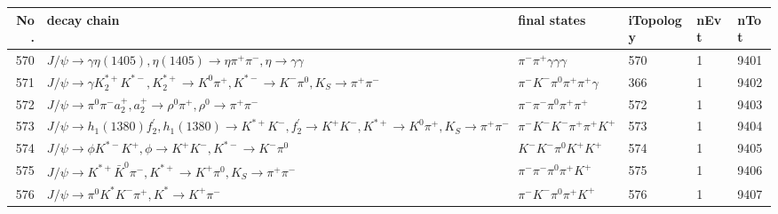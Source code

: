 \begin{table}[htbp] 
\begin{center}
\begin{small}
\begin{tabular}{rlllll}\hline\hline
 No. & decay chain & final states &  iTopology & nEvt & nTot \\\hline
570&$J/\psi       \rightarrow \gamma       \eta(1405)    , \eta(1405)     \rightarrow \eta          \pi^{+}        \pi^{-}        , \eta           \rightarrow \gamma       \gamma       $&$\pi^{-}        \pi^{+}        \gamma       \gamma       \gamma       $&  570&    1& 9401\\
571&$J/\psi       \rightarrow \gamma       K_2^{*+}       K^{*-}         , K_2^{*+}        \rightarrow K^{0}          \pi^{+}        , K^{*-}          \rightarrow K^{-}          \pi^{0}        , K_{S}           \rightarrow \pi^{+}        \pi^{-}        $&$\pi^{-}        K^{-}          \pi^{0}        \pi^{+}        \pi^{+}        \gamma       $&  366&    1& 9402\\
572&$J/\psi       \rightarrow \pi^{0}        \pi^{-}        a_{2}^{+}      , a_{2}^{+}       \rightarrow \rho^{0}      \pi^{+}        , \rho^{0}       \rightarrow \pi^{+}        \pi^{-}        $&$\pi^{-}        \pi^{-}        \pi^{0}        \pi^{+}        \pi^{+}        $&  572&    1& 9403\\
573&$J/\psi       \rightarrow h_{1}(1380)    f_2^{'}       , h_{1}(1380)     \rightarrow K^{*+}         K^{-}          , f_2^{'}        \rightarrow K^{+}          K^{-}          , K^{*+}          \rightarrow K^{0}          \pi^{+}        , K_{S}           \rightarrow \pi^{+}        \pi^{-}        $&$\pi^{-}        K^{-}          K^{-}          \pi^{+}        \pi^{+}        K^{+}          $&  573&    1& 9404\\
574&$J/\psi       \rightarrow \phi           K^{*-}         K^{+}          , \phi            \rightarrow K^{+}          K^{-}          , K^{*-}          \rightarrow K^{-}          \pi^{0}        $&$K^{-}          K^{-}          \pi^{0}        K^{+}          K^{+}          $&  574&    1& 9405\\
575&$J/\psi       \rightarrow K^{*+}         \bar{K}^{0}   \pi^{-}        , K^{*+}          \rightarrow K^{+}          \pi^{0}        , K_{S}           \rightarrow \pi^{+}        \pi^{-}        $&$\pi^{-}        \pi^{-}        \pi^{0}        \pi^{+}        K^{+}          $&  575&    1& 9406\\
576&$J/\psi       \rightarrow \pi^{0}        K^{*}          K^{-}          \pi^{+}        , K^{*}           \rightarrow K^{+}          \pi^{-}        $&$\pi^{-}        K^{-}          \pi^{0}        \pi^{+}        K^{+}          $&  576&    1& 9407\\

\end{tabular}
\end{small}
\end{center}
\end{table}
